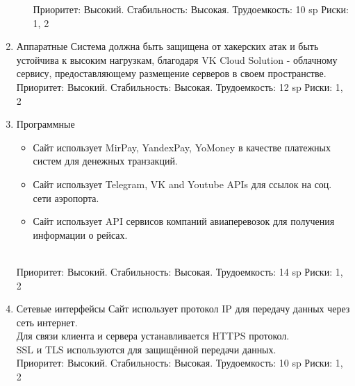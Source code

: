 \begin{enumerate}
\begin{enumerate}
                        Приоритет: Высокий. Стабильность: Высокая. Трудоемкость: 10 sp
                        Риски: 1, 2

            \end{enumerate}
      \item Аппаратные
            Система должна быть защищена от хакерских атак и быть устойчива к высоким нагрузкам, благодаря
            VK Cloud Solution - облачному сервису, предоставляющему размещение серверов в своем пространстве.
            \\
            Приоритет: Высокий. Стабильность: Высокая. Трудоемкость: 12 sp
            Риски: 1, 2
            \\
      \item Программные
            \begin{itemize}
                  \item Сайт использует MirPay, YandexPay, YoMoney в качестве платежных систем для денежных транзакций.
                  \item Сайт использует Telegram, VK and Youtube APIs для ссылок на соц. сети аэропорта.
                  \item Сайт использует API сервисов компаний авиаперевозок для получения информации о рейсах.
            \end{itemize}
            \\
            Приоритет: Высокий. Стабильность: Высокая. Трудоемкость: 14 sp
            Риски: 1, 2

      \item Сетевые интерфейсы
            Сайт использует протокол IP для передачу данных через сеть интернет.
            \\
            Для связи клиента и сервера устанавливается HTTPS протокол.
            \\
            SSL и TLS используются для защищённой передачи данных.
            \\
            Приоритет: Высокий. Стабильность: Высокая. Трудоемкость: 10 sp
            Риски: 1, 2

\end{enumerate}